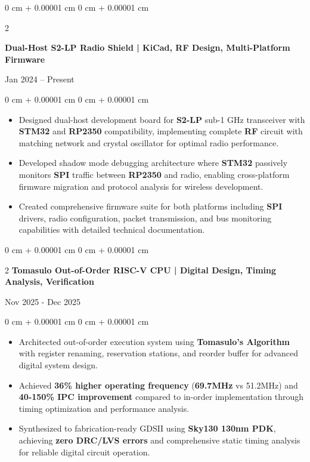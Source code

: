 \documentclass[10pt, letterpaper]{article}
\newenvironment{highlights}{
    \begin{itemize}[
        topsep=0.05 cm,
        parsep=0.05 cm,
        partopsep=0pt,
        itemsep=0pt,
        leftmargin=0 cm + 10pt
    ]
}{
    \end{itemize}
}
\newenvironment{onecolentry}{
    \begin{adjustwidth}{
        0 cm + 0.00001 cm
    }{
        0 cm + 0.00001 cm
    }
}{
    \end{adjustwidth}
}
\newenvironment{twocolentry}[2][]{
    \onecolentry
    \def\secondColumn{#2}
    \setcolumnwidth{\fill, 4.5 cm}
    \begin{paracol}{2}
}{
    \switchcolumn \raggedleft \secondColumn
    \end{paracol}
    \endonecolentry
}
\begin{document}
        \vspace{0.10 cm}
        \begin{twocolentry}{
            Jan 2024 – Present
        }
            \textbf{Dual-Host S2-LP Radio Shield | KiCad, RF Design, Multi-Platform Firmware}
        \end{twocolentry}
        \vspace{0.05 cm}
        \begin{onecolentry}
            \begin{highlights}
                \item Designed dual-host development board for \textbf{S2-LP} sub-1 GHz transceiver with \textbf{STM32} and \textbf{RP2350} compatibility, implementing complete \textbf{RF} circuit with matching network and crystal oscillator for optimal radio performance.
                \item Developed shadow mode debugging architecture where \textbf{STM32} passively monitors \textbf{SPI} traffic between \textbf{RP2350} and radio, enabling cross-platform firmware migration and protocol analysis for wireless development.
                \item Created comprehensive firmware suite for both platforms including \textbf{SPI} drivers, radio configuration, packet transmission, and bus monitoring capabilities with detailed technical documentation.
            \end{highlights}
        \end{onecolentry}

        \vspace{0.10 cm}
        \begin{twocolentry}{
            Nov 2025 - Dec 2025 } \textbf{Tomasulo Out-of-Order RISC-V CPU | Digital Design, Timing Analysis, Verification}
        \end{twocolentry}
        \vspace{0.05 cm}
        \begin{onecolentry}
            \begin{highlights}
                \item Architected out-of-order execution system using \textbf{Tomasulo's Algorithm} with register renaming, reservation stations, and reorder buffer for advanced digital system design.
                \item Achieved \textbf{36\% higher operating frequency} (\textbf{69.7MHz} vs 51.2MHz) and \textbf{40-150\% IPC improvement} compared to in-order implementation through timing optimization and performance analysis.
                \item Synthesized to fabrication-ready GDSII using \textbf{Sky130 130nm PDK}, achieving \textbf{zero DRC/LVS errors} and comprehensive static timing analysis for reliable digital circuit operation.
            \end{highlights}
        \end{onecolentry}
\end{document}

